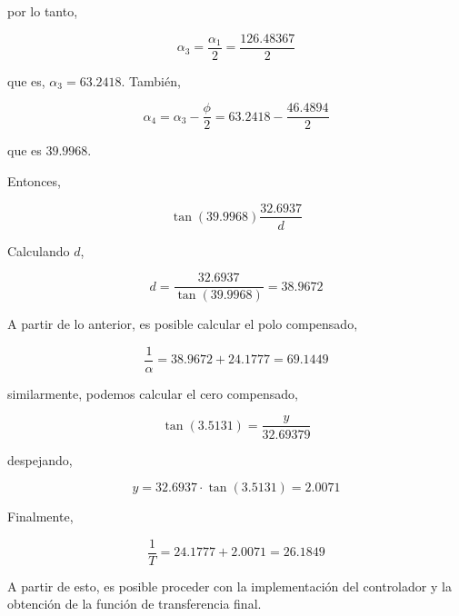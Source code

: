 \documentclass[12pt,a4paper]{article}
\begin{document}
        por lo tanto, 

        \begin{equation} 
          \alpha_{3} = \dfrac{\alpha_{1}}{2} = \dfrac{126.48367}{2}  
        \end{equation}

        que es, \( \alpha_{3} = 63.2418 \). También, 

        \begin{equation} 
          \alpha_{4} = \alpha_{3} - \dfrac{\phi}{2} = 63.2418 - \dfrac{46.4894}{2} 
        \end{equation}
        
        que es \( 39.9968 \). 

        Entonces, 

        \begin{equation} 
          \tan\left(39.9968\right)\dfrac{32.6937}{d} 
        \end{equation}

        Calculando \( d \), 

        \begin{equation}
           d = \dfrac{32.6937}{\tan\left(39.9968\right)} = 38.9672 
        \end{equation}

        A partir de lo anterior, es posible calcular el polo compensado, 
        
        \begin{equation} 
          \dfrac{1}{\alpha } = 38.9672 + 24.1777 = 69.1449 
        \end{equation}

        similarmente, podemos calcular el cero compensado, 

        \begin{equation} 
          \tan\left(3.5131 \right) = \dfrac{y}{32.69379} 
        \end{equation}

        despejando, 

        \begin{equation} 
          y = 32.6937 \cdot \tan\left(3.5131\right) = 2.0071 
        \end{equation}

        Finalmente, 

        \begin{equation} 
          \dfrac{1}{T} = 24.1777 + 2.0071 = 26.1849
        \end{equation}

        A partir de esto, es posible proceder con la implementación del controlador y la obtención de la función 
        de transferencia final. 
	
\end{document}
